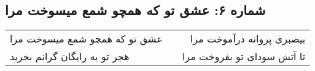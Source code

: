 \begin{center}
\section*{شماره ۶: عشق تو که همچو شمع میسوخت مرا}
\label{sec:006}
\begin{longtable}{l p{0.5cm} r}
عشق تو که همچو شمع میسوخت مرا
&&
بیصبری پروانه درآموخت مرا
\\
هجر تو به رایگان گرانم بخرید
&&
تا آتش سودای تو بفروخت مرا
\\
\end{longtable}
\end{center}
